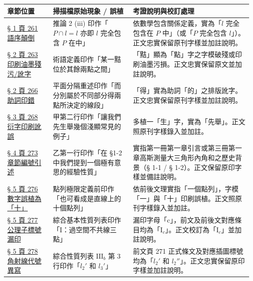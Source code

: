 \documentclass[a4paper,12pt,twoside]{article}
\begin{document}
\begin{table}[H]
\centering
\small
\renewcommand{\arraystretch}{1.35}
\begin{tabularx}{\textwidth}{|p{3.2cm}|p{3.8cm}|X|}
\hline
\textbf{章節位置} & \textbf{掃描檔原始現象 / 誤植} & \textbf{考證說明與校訂處理} \\ \hline

\hyperref[note:b3s-a1-p261-order]{§ 1 頁 261 語序顛倒} & 
推論 2 (iii) 印作「$P \cap l = l$ 亦即 $l$ 完全包含 $P$ 在中」 & 
依數學包含關係定義，實為「$l$ 完全包含在 $P$ 中」（或「$P$ 完全包含 $l$」）。正文忠實保留原刊字樣並加註說明。 \\ \hline

\hyperref[note:b3s-a1-p263-point]{§ 2 頁 263 印刷油墨殘污/訛字} & 
術語定義印作「某一黠位於其餘兩點之間」 & 
「黠」顯為「點」字之字模破殘或印刷油墨污損。正文忠實保留原文並加註說明。 \\ \hline

\hyperref[note:b3s-a1-p266-de]{§ 2 頁 266 助詞印錯} & 
平面分隔重述印作「而分別屬於不同部分得兩點所決定的線段」 & 
「得」實為助詞「的」之排版訛字。正文忠實保留原刊字樣並加註說明。 \\ \hline

\hyperref[note:b3s-a1-p268-xian]{§ 3 頁 268 衍字印刷訛誤} & 
甲第二行印作「讓我們先生舉幾個淺顯常見的例子」 & 
多植一「生」字，實為「先舉」。正文照原刊字樣錄入並加註。 \\ \hline

\hyperref[note:b3s-a1-p273-sec]{§ 4 頁 273 章節編號引述} & 
乙第一行印作「在 \S 1-2 中我們提到一個極有意思的經驗性質」 & 
實指第一冊第一章引言或第三冊第一章高斯測量大三角形內角和之歷史背景（§ 1-1 / § 1-2）。正文保留原印字樣並備註說明。 \\ \hline

\hyperref[note:b3s-a1-p276-ten]{§ 5 頁 276 數字誤植為「十」} & 
點列極限定義前印作「也可看成是直線上的十個點列」 & 
依前後文理實指「一個點列」，字模「一」與「十」印刷誤植。正文照原刊字樣錄入並加註。 \\ \hline

\hyperref[note:b3s-a1-p277-ic]{§ 5 頁 277 公理子標號漏印} & 
綜合基本性質列表印作「$\mathrm{I}$：過空間不共線三點」 & 
漏印字母「c」，前文及前後文對應條目均為「$\mathrm{I}_c$」。正文校訂為「$\mathrm{I}_c$」並加註說明。 \\ \hline

\hyperref[note:b3s-a1-p278-l3p]{§ 5 頁 278 角射線代號異寫} & 
綜合性質列表 $\mathrm{III}_b$ 第 3 行印作「$l_2'$ 和 $l_3'$」 & 
前文頁 271 正式條文及對應插圖標號均為「$l_2'$ 和 $l_2''$」。正文忠實保留原印字樣並加註說明。 \\ \hline

\end{tabularx}
\end{table}

\clearpage
\tableofcontents
\newpage


\end{document}
